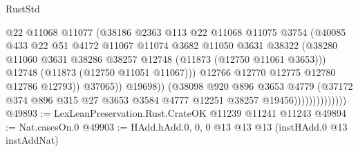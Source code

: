 \begin{lexlean}{RustStd}
\begin{coremodule}
                                      @22
                                      @11068
                                      @11077
                                      (@38186
                                        @2363
                                        @113
                                        @22
                                        @11068
                                        @11075
                                        @3754
                                        (@40085
                                          @433
                                          @22
                                          @51
                                          @4172
                                          @11067
                                          @11074
                                          @3682
                                          @11050
                                          @3631
                                          @38322
                                          (@38280
                                            @11060
                                            @3631
                                            @38286
                                            @38257
                                            @12748
                                            (@11873 (@12750 @11061 @3653)))
                                          @12748
                                          (@11873 (@12750 @11051 @11067)))
                                        @12766
                                        @12770
                                        @12775
                                        @12780
                                        @12786
                                        @12793))
                                    @37065))
                                @19698))
                            (@38098
                              @920
                              @896
                              @3653
                              @4779
                              (@37172
                                @374
                                @896
                                @315
                                @27
                                @3653
                                @3584
                                @4777
                                @12251
                                @38257
                                @19456))))))))))))))
@49893 := LexLeanPreservation.Rust.CrateOK @11239 @11241 @11243
@49894 := Nat.casesOn.{0}
@49903 := HAdd.hAdd.{0, 0, 0} @13 @13 @13 (instHAdd.{0} @13 instAddNat)

\end{coremodule}
\end{lexlean}
